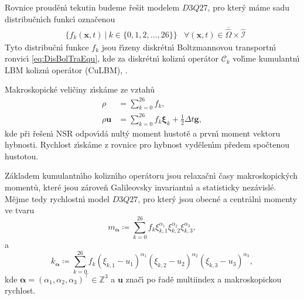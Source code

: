 
        Rovnice proud\v{e}n\'{\i} tekutin budeme \v{r}e\v{s}it modelem $D3Q27$, pro kter\'{y} m\'{a}me sadu distribu\v{c}n\'{\i}ch funkc\'{\i} ozna\v{c}enou 
        \begin{align}
            &\{ f_k(\boldsymbol{x}, t)\ | \ k \in \{0,1,2,\dots,26 \} \} & \forall (\boldsymbol{x}, t) \in \overline{\hat{\Omega}} \times \mathcal{\hat{I}} \label{eq:SetDisFunNSE}
        \end{align}
        Tyto distribu\v{c}n\'{\i} funkce $f_k$ jsou \v{r}\'{\i}zeny diskr\'{e}tn\'{\i} Boltzmannovou transportn\'{\i} ronvic\'{\i} \eqref{eq:DisBolTraEqu}, kde za diskr\'{e}tn\'{\i} kolizn\'{\i} oper\'{a}tor $\mathcal{C}_k$ vol\'{\i}me kumulantn\'{\i} LBM kolizn\'{\i} oper\'{a}tor (CuLBM), \cite{geier2015cumulant}.

        Makroskopick\'{e} veli\v{c}iny z\'{\i}sk\'{a}me ze vztah\r{u} 
        \begin{subequations}
        \label{eq:MacQuaForNSE}
            \begin{align}
                \rho & = \sum_{k=0}^{26}f_k, \\
                \rho \boldsymbol{u} & = \sum_{k=0}^{26}f_k \boldsymbol{\xi}_{k} + \frac{1}{2}\Delta t \boldsymbol{g}, \label{eq:MacMom}
            \end{align}
        \end{subequations}
        kde p\v{r}i \v{r}e\v{s}en\'{\i} NSR odpov\'{\i}d\'{a} nult\'{y} moment hustot\v{e} a prvn\'{\i} moment vektoru hybnosti. Rychlost z\'{\i}sk\'{a}me z rovnice pro hybnost vyd\v{e}len\'{\i}m p\v{r}edem spo\v{c}tenou hustotou.

        Z\'{a}kladem kumulantn\'{\i}ho kolizn\'{\i}ho oper\'{a}toru jsou relaxa\v{c}n\'{\i} \v{c}asy makroskopick\'{y}ch moment\r{u}, kter\'{e} jsou z\'{a}rove\v{n}  Galileovsky invariantn\'{\i} a statisticky nez\'{a}visl\'{e}. M\v{e}jme tedy rychlostn\'{\i} model $D3Q27$, pro kter\'{y} jsou obecn\'{e} a centr\'{a}ln\'{\i} momenty ve tvaru
        \begin{equation}
        \label{eq:RawMomCum}
            m_{\boldsymbol{\boldsymbol{\alpha}}} \coloneqq \sum_{k=0}^{26}f_k \xi_{k,1}^{\alpha_1}{\xi}_{k,2}^{\alpha_2}{\xi}_{k,3}^{\alpha_3},
        \end{equation}
        a
        \begin{equation}
        \label{eq:CenMomCum}
            k_{\boldsymbol{\boldsymbol{\alpha}}} \coloneqq \sum_{k=0}^{26}f_k ({\xi}_{k,1} - {u}_{1})^{\alpha_1}({\xi}_{k,2} - {u}_{2})^{\alpha_2}({\xi}_{k,3} - {u}_{3})^{\alpha_3}, 
        \end{equation}
        kde $\boldsymbol{\alpha} = (\alpha_1, \alpha_2, \alpha_3)^\intercal \in \mathbb{Z}^3$ a $\boldsymbol{u}$ zna\v{c}\'{\i} po \v{r}ad\v{e} multiindex a makroskopickou rychlost.

